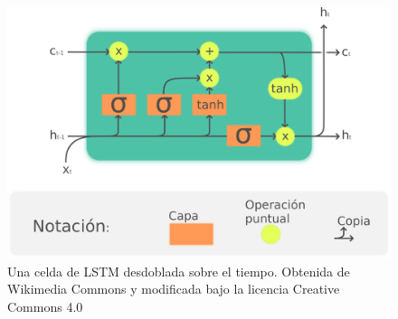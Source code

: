 \begin{figure}[hbt!]
\centering
\includegraphics[width=0.7 \textwidth]{sections/figures/LSTM_cell2.png}
\caption{Una celda de LSTM desdoblada sobre el tiempo. Obtenida de Wikimedia Commons y modificada bajo la licencia Creative Commons 4.0} \label{fig:LSTM}
\end{figure}